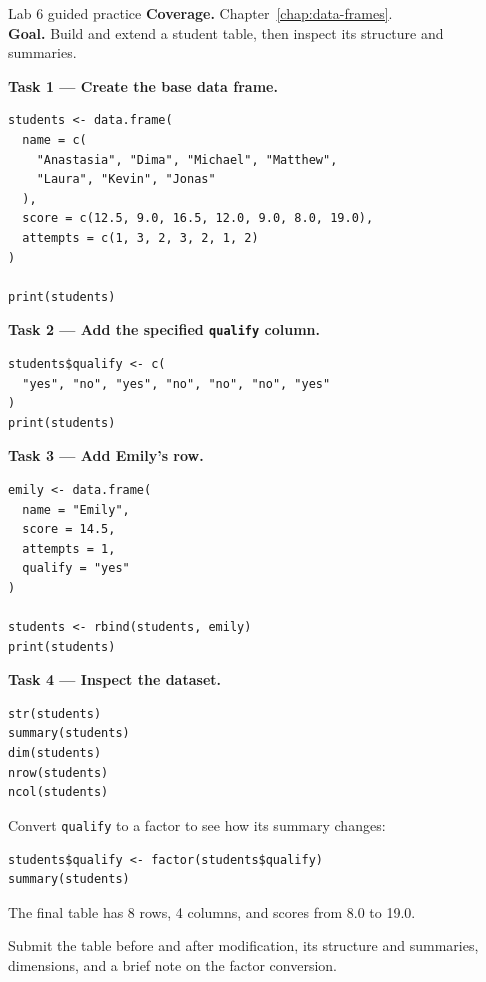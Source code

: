 
\begin{labproject}{Lab 6 guided practice}
\textbf{Coverage.} Chapter~\ref{chap:data-frames}.\\
\textbf{Goal.} Build and extend a student table, then inspect its structure and summaries.

\textbf{Task 1 --- Create the base data frame.}

\begin{lstlisting}[style=dsr]
students <- data.frame(
  name = c(
    "Anastasia", "Dima", "Michael", "Matthew",
    "Laura", "Kevin", "Jonas"
  ),
  score = c(12.5, 9.0, 16.5, 12.0, 9.0, 8.0, 19.0),
  attempts = c(1, 3, 2, 3, 2, 1, 2)
)

print(students)
\end{lstlisting}

\textbf{Task 2 --- Add the specified \texttt{qualify} column.}

\begin{lstlisting}[style=dsr]
students$qualify <- c(
  "yes", "no", "yes", "no", "no", "no", "yes"
)
print(students)
\end{lstlisting}

\textbf{Task 3 --- Add Emily's row.}

\begin{lstlisting}[style=dsr]
emily <- data.frame(
  name = "Emily",
  score = 14.5,
  attempts = 1,
  qualify = "yes"
)

students <- rbind(students, emily)
print(students)
\end{lstlisting}

\textbf{Task 4 --- Inspect the dataset.}

\begin{lstlisting}[style=dsr]
str(students)
summary(students)
dim(students)
nrow(students)
ncol(students)
\end{lstlisting}

Convert \texttt{qualify} to a factor to see how its summary changes:

\begin{lstlisting}[style=dsr]
students$qualify <- factor(students$qualify)
summary(students)
\end{lstlisting}

The final table has 8 rows, 4 columns, and scores from 8.0 to 19.0.
\end{labproject}

\begin{labdeliverable}
Submit the table before and after modification, its structure and summaries, dimensions, and a brief note on the factor conversion.
\end{labdeliverable}
